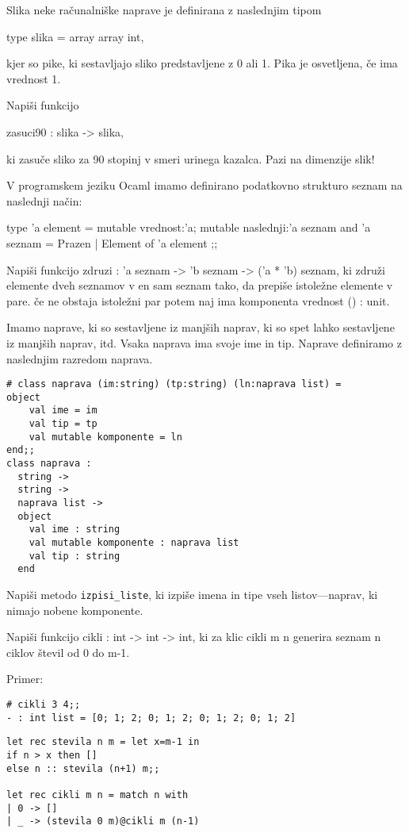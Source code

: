 \begin{ex}
  Slika neke ra\v cunalni\v ske naprave je definirana z naslednjim
  tipom

  type slika = array array int,

  kjer so pike, ki sestavljajo sliko predstavljene z 0 ali 1. Pika je
  osvetljena, \v ce ima vrednost 1.

  Napi\v si funkcijo

  zasuci90 : slika -> slika,

  ki zasu\v ce sliko za 90 stopinj v smeri urinega kazalca. Pazi na
  dimenzije slik!


\end{ex} 
\begin{ex}
  V programskem jeziku Ocaml imamo definirano podatkovno strukturo
  seznam na naslednji na\v cin:

  type 'a element = { 
     mutable vrednost:'a; 
     mutable naslednji:'a seznam 
  } 
  and 'a seznam = Prazen | Element of 'a element ;; 

  Napi\v si funkcijo zdruzi : 'a seznam -> 'b seznam -> ('a * 'b)
  seznam, ki zdru\v zi elemente dveh seznamov v en sam seznam tako, da
  prepi\v se istole\v zne elemente v pare. \v ce ne obstaja istole\v
  zni par potem naj ima komponenta vrednost () : unit.

 
\end{ex} 
\begin{ex}
  Imamo naprave, ki so sestavljene iz manj\v sih naprav, ki so spet
  lahko sestavljene iz manj\v sih naprav, itd. Vsaka naprava ima svoje
  ime in tip. Naprave definiramo z naslednjim razredom naprava.

\begin{verbatim}
# class naprava (im:string) (tp:string) (ln:naprava list) = 
object 
    val ime = im 
    val tip = tp 
    val mutable komponente = ln 
end;; 
class naprava : 
  string -> 
  string -> 
  naprava list -> 
  object 
    val ime : string 
    val mutable komponente : naprava list 
    val tip : string 
  end 
\end{verbatim}

  Napi\v si metodo \texttt{izpisi\_liste}, ki izpi\v se imena in tipe
  vseh listov—naprav, ki nimajo nobene komponente.



\end{ex} 
\begin{ex}
  Napi\v si funkcijo cikli : int -> int -> int, ki za klic cikli m n
  generira seznam n ciklov \v stevil od 0 do m-1.

\noindent\/Primer:
\begin{verbatim}
# cikli 3 4;; 
- : int list = [0; 1; 2; 0; 1; 2; 0; 1; 2; 0; 1; 2]
\end{verbatim}

\begin{sol}
\begin{verbatim}
let rec stevila n m = let x=m-1 in
if n > x then []
else n :: stevila (n+1) m;;

let rec cikli m n = match n with
| 0 -> []
| _ -> (stevila 0 m)@cikli m (n-1)
\end{verbatim}
\end{sol}

\end{ex} 
